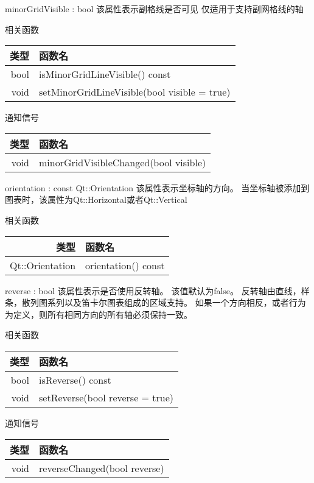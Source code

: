 minorGridVisible : bool 该属性表示副格线是否可见 仅适用于支持副网格线的轴

相关函数

\begin{tabular}{|r|l|}
\hline
类型&函数名\\ 
\hline
bool&	isMinorGridLineVisible() const\\
\hline
void & setMinorGridLineVisible(bool visible = true)\\
\hline
\end{tabular}

通知信号

\begin{tabular}{|r|l|}
\hline
类型&函数名\\ 
\hline
void& minorGridVisibleChanged(bool visible)\\
\hline
\end{tabular}

orientation : const Qt::Orientation 该属性表示坐标轴的方向。 当坐标轴被添加到图表时，该属性为Qt::Horizontal或者Qt::Vertical

相关函数

\begin{tabular}{|r|l|}
\hline
类型&函数名\\ 
\hline
Qt::Orientation	&orientation() const\\
\hline
\end{tabular}

\splitLine

reverse : bool 该属性表示是否使用反转轴。 该值默认为false。 
反转轴由直线，样条，散列图系列以及笛卡尔图表组成的区域支持。
如果一个方向相反，或者行为为定义，则所有相同方向的所有轴必须保持一致。

相关函数

\begin{tabular}{|r|l|}
\hline
类型&函数名\\ 
\hline
bool&	isReverse() const\\
\hline
void&	setReverse(bool reverse = true)\\
\hline
\end{tabular}

通知信号

\begin{tabular}{|r|l|}
\hline
类型&函数名\\ 
\hline
void&	reverseChanged(bool reverse)\\
\hline
\end{tabular}

\splitLine %
 
